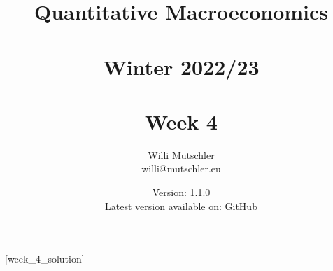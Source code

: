 
\newif\ifDisplaySolutions%


\title{Quantitative Macroeconomics\\~\\Winter 2022/23\\~\\Week 4}
\author{Willi Mutschler\\willi@mutschler.eu}
\date{Version: 1.1.0\\Latest version available on: \href{https://github.com/wmutschl/Quantitative-Macroeconomics/releases/latest/download/week_4.pdf}{GitHub}}
\maketitle\thispagestyle{empty}

\newpage
{}[week_4_solution]
\tableofcontents\thispagestyle{empty}\newpage

\setcounter{page}{1}
\newpage
\newpage
\newpage
\printbibliography
\newpage

\ifDisplaySolutions
\newpage
\appendix
\section{Solutions}

\fi
